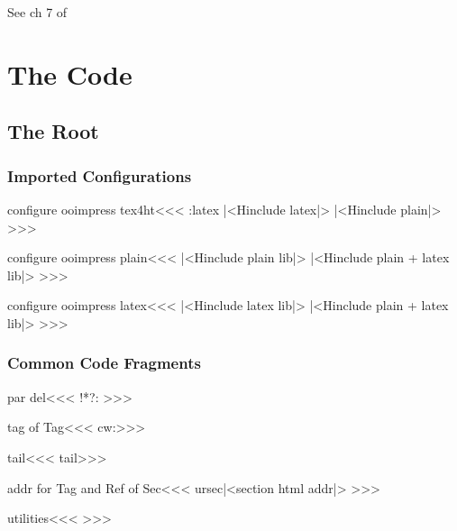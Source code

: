 \def\CopyYear.#1.{%
   \ifnum #1=\year #1\space\space\space\space\space\space
    \else          #1--\the\year\fi
}






See ch 7 of \cite{odbook}

\chapter{The Code}

\section{The Root}

\subsection{Imported Configurations}


\<configure ooimpress tex4ht\><<<
\if:latex  |<Hinclude latex|>
\else      |<Hinclude plain|>  \fi
>>>


\<configure ooimpress plain\><<<
|<Hinclude plain lib|>
|<Hinclude plain + latex lib|>
>>>

\<configure ooimpress latex\><<<
|<Hinclude latex lib|>
|<Hinclude plain + latex lib|>
>>>

\subsection{Common Code Fragments}

\<par del\><<<
!*?: >>>

\<tag of Tag\><<<
 cw:>>>

\<tail\><<<
tail>>>

\<addr for Tag and Ref of Sec\><<<
\xdef\:cursec{|<section html addr|>}%
>>>

\<utilities\><<<
\newif\ifHCond
\def\:gobbleM#1->{}
>>>


